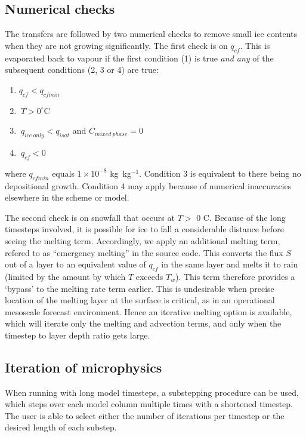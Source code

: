 \documentclass{UMDP_article}
\begin{document}
\subsection{Numerical checks}
\label{sec:num_check}
The transfers are followed by two numerical checks to remove small ice contents 
when they
are not growing significantly. The first check is on $q_{cf}$. This is evaporated
back to vapour if the first condition (1) is true \textit{and any} 
of the subsequent conditions (2, 3 or 4)
are true:

\begin{enumerate}
\item $q_{cf} < q_{cfmin}$ \\
\item $~T > 0^{\circ}$C   \\   
\item $~q_{ice~only} < q_{isat}$ and $ C_{mixed~phase} = 0$ \\
\item $~q_{cf} < 0$\\
\end{enumerate}

where $q_{cfmin}$ equals $1 \times 10^{-8}$ kg~kg$^{-1}$. Condition 3 is equivalent
to there being no depositional growth. 
Condition 4 may apply because of numerical inaccuracies elsewhere
in the scheme or model.

The second check is on snowfall that occurs at $T >$ 0 \textdegree C. 
Because of the
long timesteps involved, it is possible for ice to fall a considerable distance
before seeing the melting term. Accordingly, we apply an additional melting
term, refered to as ``emergency melting'' in the source code.
This converts the flux $S$ out of a layer to an equivalent value
of $q_{cf}$ in the same layer and melts it to rain (limited by the amount by which
$T$ exceeds $T_w$). This term therefore provides a `bypass' to the melting 
rate
term earlier. This is undesirable when precise location of the melting layer at
the surface is critical, as in an operational mesoscale forecast environment.
Hence an iterative melting option is available, which will iterate only the melting
and advection terms, and only when the timestep to layer depth ratio gets large.

\subsection{Iteration of microphysics}

When running with long model timesteps, a substepping procedure can be used, which steps over each model column multiple times with a shortened timestep. The user is able to select either the number of iterations per timestep or the desired length of each substep.
\end{document}
